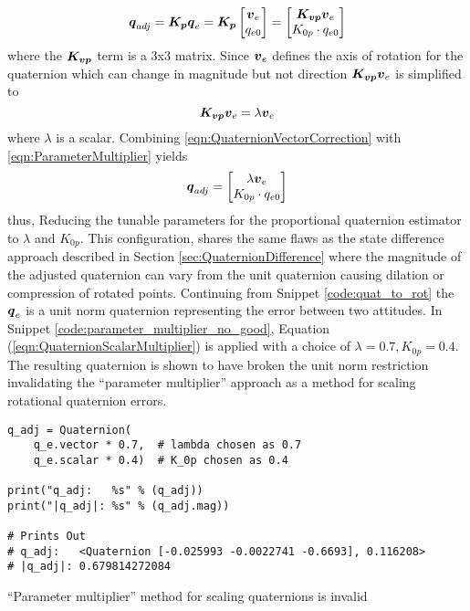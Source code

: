 \begin{equation}
  \boldsymbol{q}_{adj} = \boldsymbol{K_p} \boldsymbol{q}_e
    = \boldsymbol{K_p} \begin{bmatrix} \boldsymbol{v}_e \\ q_{e0} \end{bmatrix}
    = \begin{bmatrix} \boldsymbol{K_{vp}}\boldsymbol{v}_e \\ K_{0p} \cdot q_{e0} \end{bmatrix}
  \label{eqn:ParameterMultiplier}
\end{equation}
where the $\boldsymbol{K_{vp}}$ term is a 3x3 matrix.  Since $\boldsymbol{v}_e$ defines the axis of rotation for the quaternion which can change in magnitude but not direction $\boldsymbol{K_{vp}}\boldsymbol{v}_e$ is simplified to
\begin{equation}
  \boldsymbol{K_{vp}} \boldsymbol{v}_e = \lambda \boldsymbol{v}_e
  \label{eqn:QuaternionVectorCorrection}
\end{equation}
where $\lambda$ is a scalar.
Combining \ref{eqn:QuaternionVectorCorrection} with \ref{eqn:ParameterMultiplier} yields
\begin{equation}
  \boldsymbol{q}_{adj} = \begin{bmatrix} \lambda \boldsymbol{v}_e \\ K_{0p} \cdot q_{e0} \end{bmatrix}
  \label{eqn:QuaternionScalarMultiplier}
\end{equation}
thus, Reducing the tunable parameters for the proportional quaternion estimator to $\lambda$ and $K_{0p}$.  This configuration, shares the same flaws as the state difference approach described in Section \ref{sec:QuaternionDifference} where the magnitude of the adjusted quaternion can vary from the unit quaternion causing dilation or compression of rotated points.  Continuing from Snippet \ref{code:quat_to_rot} the $\boldsymbol{q}_e$ is a unit norm quaternion representing the error between two attitudes.  In Snippet \ref{code:parameter_multiplier_no_good}, Equation (\ref{eqn:QuaternionScalarMultiplier}) is applied with a choice of $\lambda = 0.7, K_{0p} = 0.4$.  The resulting quaternion is shown to have broken the unit norm restriction invalidating the ``parameter multiplier'' approach as a method for scaling rotational quaternion errors.
\begin{listing}
\begin{singlespace}
  \begin{verbatim}
q_adj = Quaternion(
    q_e.vector * 0.7,  # lambda chosen as 0.7
    q_e.scalar * 0.4)  # K_0p chosen as 0.4

print("q_adj:   %s" % (q_adj))
print("|q_adj|: %s" % (q_adj.mag))

# Prints Out
# q_adj:   <Quaternion [-0.025993 -0.0022741 -0.6693], 0.116208>
# |q_adj|: 0.679814272084
  \end{verbatim}
\caption{``Parameter multiplier'' method for scaling quaternions is invalid}
\label{code:parameter_multiplier_no_good}
\nocite{minted}
\end{singlespace}
\end{listing}


